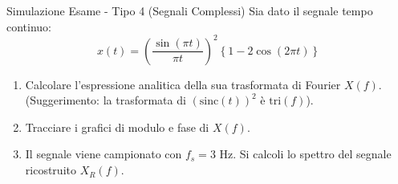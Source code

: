
\begin{esercizio}{Simulazione Esame - Tipo 4 (Segnali Complessi)}
    Sia dato il segnale tempo continuo:
    \[
        x(t) = \left( \frac{\sin(\pi t)}{\pi t} \right)^2 \left\{ 1 - 2\cos(2\pi t) \right\}
    \]
    \begin{enumerate}
        \item Calcolare l'espressione analitica della sua trasformata di Fourier $X(f)$.
        (Suggerimento: la trasformata di $(\text{sinc}(t))^2$ è $\text{tri}(f)$).
        \item Tracciare i grafici di modulo e fase di $X(f)$.
        \item Il segnale viene campionato con $f_s = 3$ Hz. Si calcoli lo spettro del segnale ricostruito $X_R(f)$.
    \end{enumerate}
\end{esercizio}